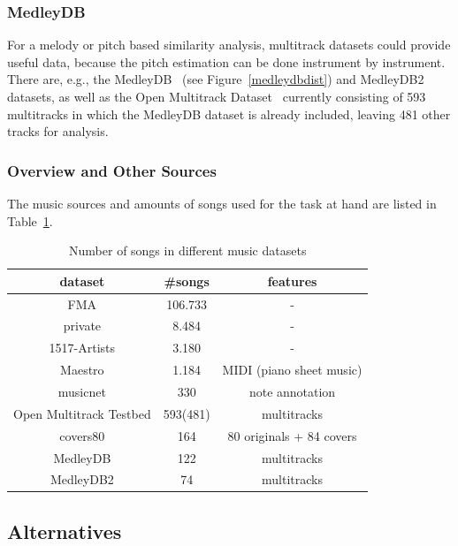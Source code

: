 \subsubsection{MedleyDB}

For a melody or pitch based similarity analysis, multitrack datasets could provide useful data, because the pitch estimation can be done instrument by instrument. There are, e.g., the MedleyDB~\cite{medleydb1} (see Figure~\ref{medleydbdist}) and MedleyDB2~\cite{medleydb2} datasets, as well as the Open Multitrack Dataset~\cite{openmult1} currently consisting of 593 multitracks in which the MedleyDB dataset is already included, leaving 481 other tracks for analysis.

\subsubsection{Overview and Other Sources}

The music sources and amounts of songs used for the task at hand are listed in Table~\ref{table_dsets}.

\begin{table}[h]
	\begin{center}
		\begin{tabular}{|c||c|c|}
			\hline
			dataset & \#songs & features\\
			\hline
			\hline
			FMA & 106.733 & -\\
			\hline
			private & 8.484 & -\\
			\hline
			1517-Artists & 3.180 & -\\
			\hline
			Maestro & 1.184 & MIDI (piano sheet music)\\
			\hline
			musicnet & 330  & note annotation\\
			\hline
			Open Multitrack Testbed & 593(481) & multitracks\\
			\hline
			covers80 & 164  & 80 originals + 84 covers\\
			\hline
			MedleyDB &  122  & multitracks\\
			\hline
			MedleyDB2 &  74  & multitracks\\
			\hline
		\end{tabular}
	\end{center}
	\caption{Number of songs in different music datasets}
	\label{table_dsets}
\end{table}
\FloatBarrier

\subsection{Alternatives}

